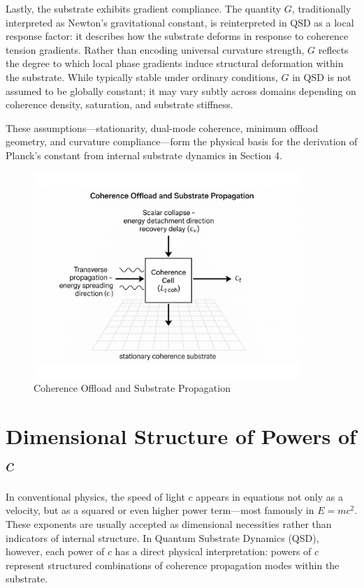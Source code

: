 \documentclass[ht-mathphys]{ht-fmt}
\theoremstyle{thmstyleone}%
\theoremstyle{thmstyletwo}%
\theoremstyle{thmstylethree}%
\begin{document}
Lastly, the substrate exhibits gradient compliance. The quantity $G$, traditionally interpreted as Newton's gravitational constant, is reinterpreted in QSD as a local response factor: it describes how the substrate deforms in response to coherence tension gradients. Rather than encoding universal curvature strength, $G$ reflects the degree to which local phase gradients induce structural deformation within the substrate. While typically stable under ordinary conditions, $G$ in QSD is not assumed to be globally constant; it may vary subtly across domains depending on coherence density, saturation, and substrate stiffness.

These assumptions—stationarity, dual-mode coherence, minimum offload geometry, and curvature compliance—form the physical basis for the derivation of Planck’s constant from internal substrate dynamics in Section 4.

\begin{figure}[H]
    \centering
    \includegraphics[width=0.9\textwidth]{figures/qsd_lcohcsct.pdf}
    \caption{Coherence Offload and Substrate Propagation}
    \label{fig:qsd_lcohcsct}
\end{figure}

\section{Dimensional Structure of Powers of \texorpdfstring{$c$}{c}}

In conventional physics, the speed of light $c$ appears in equations not only as a velocity, but as a squared or even higher power term—most famously in $E = mc^2$. These exponents are usually accepted as dimensional necessities rather than indicators of internal structure. In Quantum Substrate Dynamics (QSD), however, each power of $c$ has a direct physical interpretation: powers of $c$ represent structured combinations of coherence propagation modes within the substrate.
\end{document}
